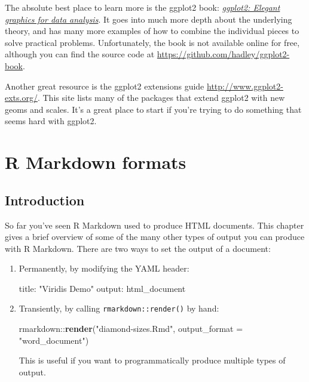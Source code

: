 \documentclass[]{book}
\newenvironment{Shaded}{\begin{snugshade}}{\end{snugshade}}
\newcommand{\KeywordTok}[1]{\textcolor[rgb]{0.13,0.29,0.53}{\textbf{{#1}}}}
\newcommand{\DataTypeTok}[1]{\textcolor[rgb]{0.13,0.29,0.53}{{#1}}}
\newcommand{\StringTok}[1]{\textcolor[rgb]{0.31,0.60,0.02}{{#1}}}
\newcommand{\FunctionTok}[1]{\textcolor[rgb]{0.00,0.00,0.00}{{#1}}}
\newcommand{\NormalTok}[1]{{#1}}
\begin{document}
The absolute best place to learn more is the ggplot2 book:
\href{https://amzn.com/331924275X}{\emph{ggplot2: Elegant graphics for
data analysis}}. It goes into much more depth about the underlying
theory, and has many more examples of how to combine the individual
pieces to solve practical problems. Unfortunately, the book is not
available online for free, although you can find the source code at
\url{https://github.com/hadley/ggplot2-book}.

Another great resource is the ggplot2 extensions guide
\url{http://www.ggplot2-exts.org/}. This site lists many of the packages
that extend ggplot2 with new geoms and scales. It's a great place to
start if you're trying to do something that seems hard with ggplot2.

\hypertarget{r-markdown-formats}{\chapter{R Markdown
formats}\label{r-markdown-formats}}

\section{Introduction}\label{introduction-20}

So far you've seen R Markdown used to produce HTML documents. This
chapter gives a brief overview of some of the many other types of output
you can produce with R Markdown. There are two ways to set the output of
a document:

\begin{enumerate}
\def\labelenumi{\arabic{enumi}.}
\item
  Permanently, by modifying the YAML header:

\begin{Shaded}
\begin{Highlighting}[]
\FunctionTok{title:} \StringTok{"Viridis Demo"}
\FunctionTok{output:} \NormalTok{html_document}
\end{Highlighting}
\end{Shaded}
\item
  Transiently, by calling \texttt{rmarkdown::render()} by hand:

\begin{Shaded}
\begin{Highlighting}[]
\NormalTok{rmarkdown::}\KeywordTok{render}\NormalTok{(}\StringTok{"diamond-sizes.Rmd"}\NormalTok{, }\DataTypeTok{output_format =} \StringTok{"word_document"}\NormalTok{)}
\end{Highlighting}
\end{Shaded}

  This is useful if you want to programmatically produce multiple types
  of output.
\end{enumerate}
\end{document}
